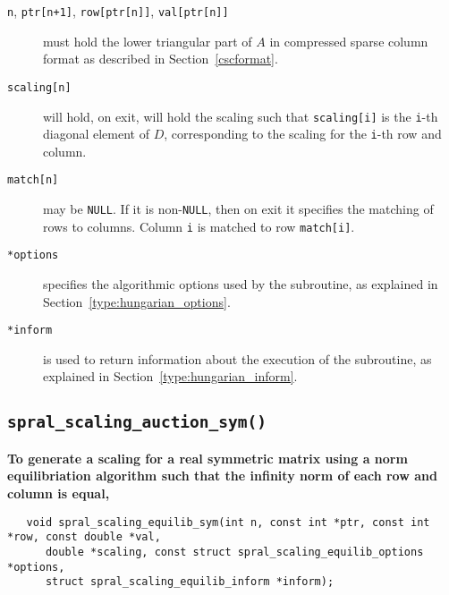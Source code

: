 \begin{description}

\item[\texttt{n}, \texttt{ptr[n+1]}, \texttt{row[ptr[n]]}, \texttt{val[ptr[n]]}] must hold the lower triangular part of $A$ in compressed sparse column format as described in Section~\ref{cscformat}.

\item[\texttt{scaling[n]}] will hold, on exit, will hold the scaling such that
\texttt{scaling[i]} is the \texttt{i}-th diagonal element of $D$,
corresponding to the scaling for the \texttt{i}-th row and column.

\item[\texttt{match[n]}] may be \texttt{NULL}. If it is non-\texttt{NULL},
then on exit it specifies the matching of rows to columns.
Column \texttt{i} is matched to row \texttt{match[i]}.

\item[\texttt{*options}] specifies the algorithmic options used by the subroutine, as explained in Section~\ref{type:hungarian_options}.

\item[\texttt{*inform}] is used to return information about the execution of the subroutine, as explained in Section~\ref{type:hungarian_inform}.


\end{description}


\subsection{\texttt{spral\_scaling\_auction\_sym()}}

\textbf{\noindent
   To generate a scaling for a real symmetric matrix using a norm equilibriation algorithm such that the infinity norm of each row and column is equal,
}
\vspace*{-0.1cm}
\begin{verbatim}
   void spral_scaling_equilib_sym(int n, const int *ptr, const int *row, const double *val,
      double *scaling, const struct spral_scaling_equilib_options *options,
      struct spral_scaling_equilib_inform *inform);
\end{verbatim}

